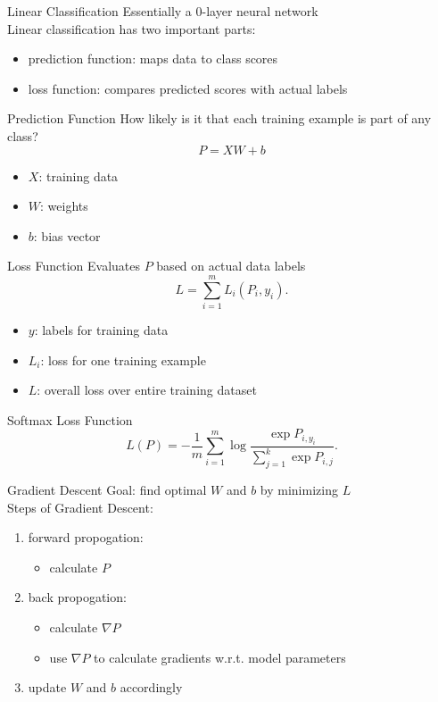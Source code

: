 \documentclass{beamer}
\begin{document}
  \begin{frame}{Linear Classification}
    Essentially a 0-layer neural network\\
    Linear classification has two important parts:
    \begin{itemize}
      \item prediction function: maps data to class scores
      \item loss function: compares predicted scores with actual labels
    \end{itemize}
  \end{frame}

  \begin{frame}{Prediction Function}
    How likely is it that each training example is part of any class?
    $$ P = XW + b $$
    \begin{itemize}
      \item $X$: training data
      \item $W$: weights
      \item $b$: bias vector
    \end{itemize}
  \end{frame}

  \begin{frame}{Loss Function}
    Evaluates $P$ based on actual data labels
    $$ L = \sum_{i=1}^m L_i(P_i, y_i). $$
    \begin{itemize}
      \item $y$: labels for training data
      \item $L_i$: loss for one training example
      \item $L$: overall loss over entire training dataset
    \end{itemize}
  \end{frame}

  \begin{frame}{Softmax Loss Function}
    $$L(P) = -\frac{1}{m} \sum_{i=1}^m \log \frac{\exp{P_{i, y_i}}}
              {\sum_{j=1}^k \exp{P_{i, j}}}. $$
  \end{frame}

  \begin{frame}{Gradient Descent}
    Goal: find optimal $W$ and $b$ by minimizing $L$\\
    Steps of Gradient Descent:
    \begin{enumerate}
      \item forward propogation: \begin{itemize}
        \item calculate $P$
      \end{itemize}
      \item back propogation: \begin{itemize}
        \item calculate $\nabla P$
        \item use $\nabla P$ to calculate gradients w.r.t. model parameters
      \end{itemize}
      \item update $W$ and $b$ accordingly
    \end{enumerate}
  \end{frame}
\end{document}
